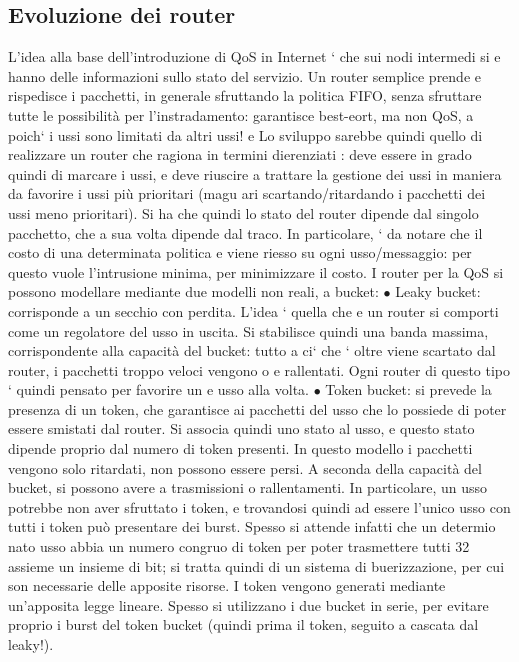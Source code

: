 \documentclass[a4paper,12pt]{article}
\begin{document}
\subsection{Evoluzione dei router}
L'idea alla base dell'introduzione di QoS in Internet ` che sui nodi intermedi si
e
hanno delle informazioni sullo stato del servizio. Un router semplice prende e
rispedisce i pacchetti, in generale sfruttando la politica FIFO, senza sfruttare
tutte le possibilità per l'instradamento: garantisce best-eort, ma non QoS,
a
poich` i ussi sono limitati da altri ussi!
e
Lo sviluppo sarebbe quindi quello di realizzare un router che ragiona in termini dierenziati : deve essere in grado
quindi di marcare i ussi, e deve riuscire
a trattare la gestione dei ussi in maniera da favorire i ussi più prioritari (magu
ari scartando/ritardando i pacchetti dei ussi meno prioritari). Si ha che quindi
lo stato del router dipende dal singolo pacchetto, che a sua volta dipende dal
traco. In particolare, ` da notare che il costo di una determinata politica
e
viene riesso su ogni usso/messaggio: per questo vuole l'intrusione minima,
per minimizzare il costo.
I router per la QoS si possono modellare mediante due modelli non reali, a
bucket:
$\bullet$ Leaky bucket: corrisponde a un secchio con perdita. L'idea ` quella che
e
un router si comporti come un regolatore del usso in uscita. Si stabilisce
quindi una banda massima, corrispondente alla capacità del bucket: tutto
a
ci` che ` oltre viene scartato dal router, i pacchetti troppo veloci vengono
o
e
rallentati. Ogni router di questo tipo ` quindi pensato per favorire un
e
usso alla volta.
$\bullet$ Token bucket: si prevede la presenza di un token, che garantisce ai pacchetti del usso che lo possiede di
poter essere smistati dal router. Si associa
quindi uno stato al usso, e questo stato dipende proprio dal numero di
token presenti. In questo modello i pacchetti vengono solo ritardati, non
possono essere persi. A seconda della capacità del bucket, si possono avere
a
trasmissioni o rallentamenti. In particolare, un usso potrebbe non aver
sfruttato i token, e trovandosi quindi ad essere l'unico usso con tutti i
token può presentare dei burst. Spesso si attende infatti che un determio
nato usso abbia un numero congruo di token per poter trasmettere tutti
32
assieme un insieme di bit; si tratta quindi di un sistema di buerizzazione,
per cui son necessarie delle apposite risorse. I token vengono generati
mediante un'apposita legge lineare.
Spesso si utilizzano i due bucket in serie, per evitare proprio i burst del token
bucket (quindi prima il token, seguito a cascata dal leaky!).
\end{document}
